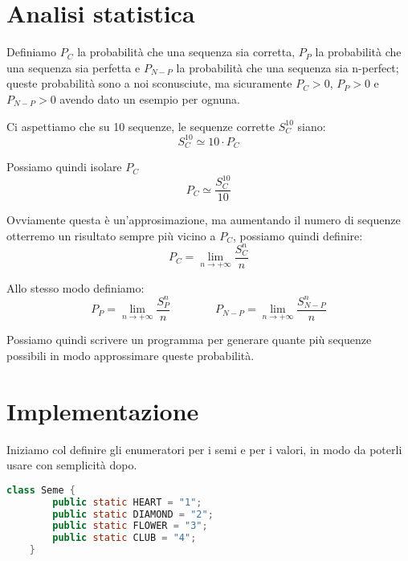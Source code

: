 \documentclass[a4paper]{article}
\begin{document}
\section{Analisi statistica}

Definiamo $P_C$ la probabilità che una sequenza sia corretta, $P_P$ la probabilità che una sequenza sia perfetta e $P_{N-P}$ la probabilità che una sequenza sia n-perfect; queste probabilità sono a noi sconusciute, ma sicuramente $P_C>0$,  $P_P>0$ e $P_{N-P}>0$ avendo dato un esempio per ognuna.

Ci aspettiamo che su 10 sequenze, le sequenze corrette $S_{C}^{10}$ siano:
\begin{equation*}
    S_{C}^{10} \simeq 10 \cdot P_C
\end{equation*}

Possiamo quindi isolare $P_C$
\begin{equation*}
    P_C \simeq \frac{S_{C}^{10}}{10}
\end{equation*}

Ovviamente questa è un'approsimazione, ma aumentando il numero di sequenze otterremo un risultato sempre più vicino a $P_C$, possiamo quindi definire:
\begin{equation*}
    P_C =  \lim_{n \to +\infty} {\frac{S_{C}^{n}}{n}}
\end{equation*}

Allo stesso modo definiamo:
\begin{equation*}
    P_P =  \lim_{n \to +\infty} {\frac{S_{P}^{n}}{n}}
    \qquad
    \qquad
    P_{N-P} =  \lim_{n \to +\infty} {\frac{S_{N-P}^{n}}{n}}
\end{equation*}

Possiamo quindi scrivere un programma per generare quante più sequenze possibili in modo approssimare queste probabilità.

\newpage

\section{Implementazione}
Iniziamo col definire gli enumeratori per i semi e per i valori, in modo da poterli usare con semplicità dopo.

\begin{lstlisting}[language=Java]
    class Seme {
        public static HEART = "1";
        public static DIAMOND = "2";
        public static FLOWER = "3";
        public static CLUB = "4";
    }
\end{lstlisting}
\end{document}
